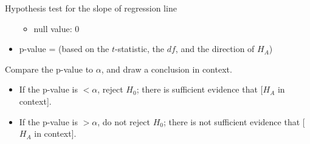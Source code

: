 \begin{onebox}{Hypothesis test for the slope of regression line}
\begin{itemize}
\begin{itemize}
\item[] null value: 0
\end{itemize}
\item[] p-value = (based on the $t$-statistic, the $df$, and the direction of $H_A$)
\end{itemize}
  Compare the p-value to $\alpha$, and draw a conclusion in context. \vspace{-1mm}
\begin{itemize}
\item[] If the p-value is $< \alpha$, reject $H_0$; there is sufficient evidence that [$H_A$ in context]. 
\item[] If the p-value is $> \alpha$, do not reject $H_0$; there is not sufficient evidence that [$H_A$ in context].
\end{itemize}\end{onebox}


